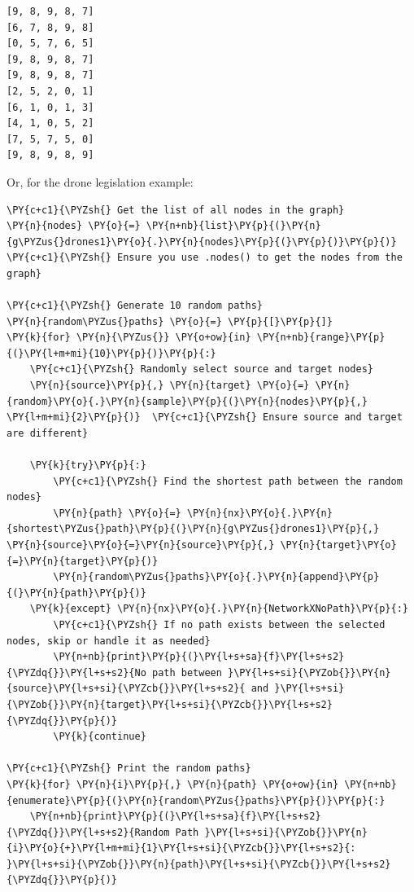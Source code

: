     \begin{Verbatim}[commandchars=\\\{\}]
[9, 8, 9, 8, 7]
[6, 7, 8, 9, 8]
[0, 5, 7, 6, 5]
[9, 8, 9, 8, 7]
[9, 8, 9, 8, 7]
[2, 5, 2, 0, 1]
[6, 1, 0, 1, 3]
[4, 1, 0, 5, 2]
[7, 5, 7, 5, 0]
[9, 8, 9, 8, 9]
    \end{Verbatim}

    Or, for the drone legislation example:

    \begin{tcolorbox}[breakable, size=fbox, boxrule=1pt, pad at break*=1mm,colback=cellbackground, colframe=cellborder]
\begin{Verbatim}[commandchars=\\\{\}]
\PY{c+c1}{\PYZsh{} Get the list of all nodes in the graph}
\PY{n}{nodes} \PY{o}{=} \PY{n+nb}{list}\PY{p}{(}\PY{n}{g\PYZus{}drones1}\PY{o}{.}\PY{n}{nodes}\PY{p}{(}\PY{p}{)}\PY{p}{)}  \PY{c+c1}{\PYZsh{} Ensure you use .nodes() to get the nodes from the graph}

\PY{c+c1}{\PYZsh{} Generate 10 random paths}
\PY{n}{random\PYZus{}paths} \PY{o}{=} \PY{p}{[}\PY{p}{]}
\PY{k}{for} \PY{n}{\PYZus{}} \PY{o+ow}{in} \PY{n+nb}{range}\PY{p}{(}\PY{l+m+mi}{10}\PY{p}{)}\PY{p}{:}
    \PY{c+c1}{\PYZsh{} Randomly select source and target nodes}
    \PY{n}{source}\PY{p}{,} \PY{n}{target} \PY{o}{=} \PY{n}{random}\PY{o}{.}\PY{n}{sample}\PY{p}{(}\PY{n}{nodes}\PY{p}{,} \PY{l+m+mi}{2}\PY{p}{)}  \PY{c+c1}{\PYZsh{} Ensure source and target are different}

    \PY{k}{try}\PY{p}{:}
        \PY{c+c1}{\PYZsh{} Find the shortest path between the random nodes}
        \PY{n}{path} \PY{o}{=} \PY{n}{nx}\PY{o}{.}\PY{n}{shortest\PYZus{}path}\PY{p}{(}\PY{n}{g\PYZus{}drones1}\PY{p}{,} \PY{n}{source}\PY{o}{=}\PY{n}{source}\PY{p}{,} \PY{n}{target}\PY{o}{=}\PY{n}{target}\PY{p}{)}
        \PY{n}{random\PYZus{}paths}\PY{o}{.}\PY{n}{append}\PY{p}{(}\PY{n}{path}\PY{p}{)}
    \PY{k}{except} \PY{n}{nx}\PY{o}{.}\PY{n}{NetworkXNoPath}\PY{p}{:}
        \PY{c+c1}{\PYZsh{} If no path exists between the selected nodes, skip or handle it as needed}
        \PY{n+nb}{print}\PY{p}{(}\PY{l+s+sa}{f}\PY{l+s+s2}{\PYZdq{}}\PY{l+s+s2}{No path between }\PY{l+s+si}{\PYZob{}}\PY{n}{source}\PY{l+s+si}{\PYZcb{}}\PY{l+s+s2}{ and }\PY{l+s+si}{\PYZob{}}\PY{n}{target}\PY{l+s+si}{\PYZcb{}}\PY{l+s+s2}{\PYZdq{}}\PY{p}{)}
        \PY{k}{continue}

\PY{c+c1}{\PYZsh{} Print the random paths}
\PY{k}{for} \PY{n}{i}\PY{p}{,} \PY{n}{path} \PY{o+ow}{in} \PY{n+nb}{enumerate}\PY{p}{(}\PY{n}{random\PYZus{}paths}\PY{p}{)}\PY{p}{:}
    \PY{n+nb}{print}\PY{p}{(}\PY{l+s+sa}{f}\PY{l+s+s2}{\PYZdq{}}\PY{l+s+s2}{Random Path }\PY{l+s+si}{\PYZob{}}\PY{n}{i}\PY{o}{+}\PY{l+m+mi}{1}\PY{l+s+si}{\PYZcb{}}\PY{l+s+s2}{: }\PY{l+s+si}{\PYZob{}}\PY{n}{path}\PY{l+s+si}{\PYZcb{}}\PY{l+s+s2}{\PYZdq{}}\PY{p}{)}
\end{Verbatim}
\end{tcolorbox}

